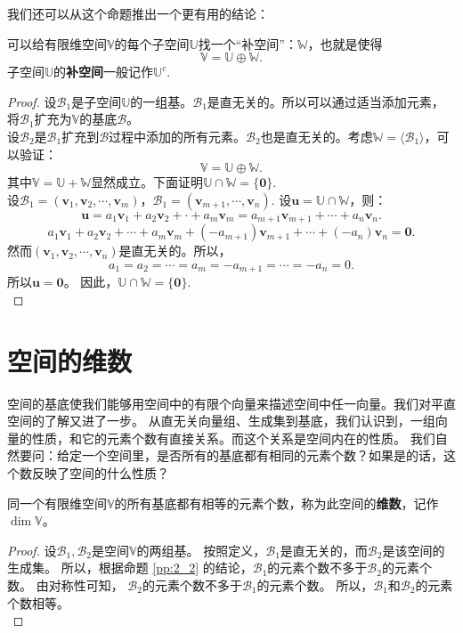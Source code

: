 \documentclass[12pt,UTF8,fontset=none]{ctexbook}
\begin{document}
我们还可以从这个命题推出一个更有用的结论：
\begin{pp}\label{pp:2_8}
    可以给有限维空间$\mathbb{V}$的每个子空间$\mathbb{U}$找一个“补空间”：$\mathbb{W}$，也就是使得
    $$ \mathbb{V} = \mathbb{U} \oplus \mathbb{W}.$$
    子空间$\mathbb{U}$的\textbf{补空间}一般记作$\mathbb{U}^c.$
\end{pp}
\begin{proof} %
    设$\mathcal{B}_1$是子空间$\mathbb{U}$的一组基。$\mathcal{B}_1$是直无关的。所以可以通过适当添加元素，将$\mathcal{B}_1$扩充为$\mathbb{V}$的基底$\mathcal{B}$。\\
    设$\mathcal{B}_2$是$\mathcal{B}_1$扩充到$\mathcal{B}$过程中添加的所有元素。$\mathcal{B}_2$也是直无关的。考虑$\mathbb{W} = \langle\mathcal{B}_1\rangle$，可以验证：
    $$ \mathbb{V} = \mathbb{U} \oplus \mathbb{W}.$$
    其中$ \mathbb{V} = \mathbb{U} + \mathbb{W}$显然成立。下面证明$ \mathbb{U} \cap \mathbb{W} = \{\mathbf{0}\}$.\\
    设$\mathcal{B}_1 = (\mathbf{v}_1, \mathbf{v}_2, \cdots , \mathbf{v}_m )$，$\mathcal{B}_1 = (\mathbf{v}_{m+1}, \cdots , \mathbf{v}_n )$. 设$ \mathbf{u} = \mathbb{U} \cap \mathbb{W}$，则：
    $$ \mathbf{u} = a_1\mathbf{v}_1 + a_2\mathbf{v}_2 + \cdot + a_m\mathbf{v}_m = a_{m+1}\mathbf{v}_{m+1} + \cdots + a_n\mathbf{v}_n. $$
    $$a_1\mathbf{v}_1 + a_2\mathbf{v}_2 + \cdots + a_m\mathbf{v}_m + (-a_{m+1})\mathbf{v}_{m+1} + \cdots + (-a_{n})\mathbf{v}_{n} = \mathbf{0}. $$
    然而$(\mathbf{v}_1, \mathbf{v}_2, \cdots , \mathbf{v}_n )$是直无关的。所以，
    $$ a_1 = a_2 = \cdots = a_m = -a_{m+1} = \cdots = -a_n = 0.$$
    所以$\mathbf{u} = \mathbf{0}$。
    因此，$ \mathbb{U} \cap \mathbb{W} = \{\mathbf{0}\}$.\\
\end{proof}


\section{空间的维数}
空间的基底使我们能够用空间中的有限个向量来描述空间中任一向量。我们对平直空间的了解又进了一步。
从直无关向量组、生成集到基底，我们认识到，一组向量的性质，和它的元素个数有直接关系。而这个关系是空间内在的性质。
我们自然要问：给定一个空间里，是否所有的基底都有相同的元素个数？如果是的话，这个数反映了空间的什么性质？

\begin{pp}\label{pp:2_9}
    同一个有限维空间$\mathbb{V}$的所有基底都有相等的元素个数，称为此空间的{\bfseries 维数}，记作$\dim\mathbb{V}$。
\end{pp}
\begin{proof} %
    设$\mathcal{B}_1, \mathcal{B}_2$是空间$\mathbb{V}$的两组基。
    按照定义，$\mathcal{B}_1$是直无关的，而$\mathcal{B}_2$是该空间的生成集。
    所以，根据命题 \ref{pp:2_2} 的结论，$\mathcal{B}_1$的元素个数不多于$\mathcal{B}_2$的元素个数。
    由对称性可知， $\mathcal{B}_2$的元素个数不多于$\mathcal{B}_1$的元素个数。
    所以，$\mathcal{B}_1$和$\mathcal{B}_2$的元素个数相等。\\
\end{proof}
\end{document}
